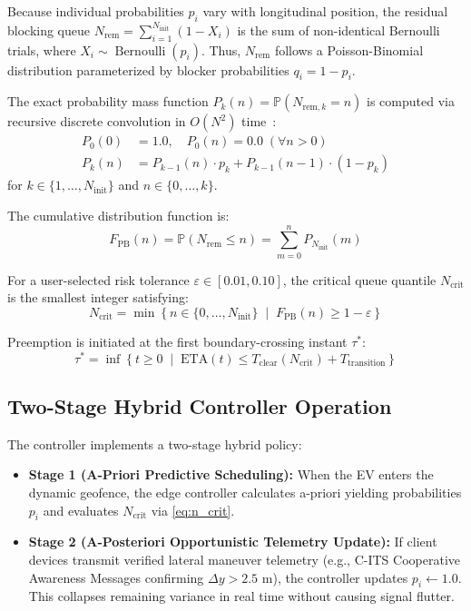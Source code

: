 \documentclass[journal,10pt,twocolumn]{IEEEtran}
\begin{document}
Because individual probabilities $p_i$ vary with longitudinal position, the residual blocking queue $N_{\text{rem}} = \sum_{i=1}^{N_{\text{init}}} (1 - X_i)$ is the sum of non-identical Bernoulli trials, where $X_i \sim \operatorname{Bernoulli}(p_i)$. Thus, $N_{\text{rem}}$ follows a Poisson-Binomial distribution parameterized by blocker probabilities $q_i = 1 - p_i$.

The exact probability mass function $P_k(n) = \mathbb{P}(N_{\text{rem}, k} = n)$ is computed via recursive discrete convolution in $O(N^2)$ time~\cite{hong2013}:
\begin{align}
P_0(0) &= 1.0, \quad P_0(n) = 0.0 \; (\forall n > 0) \\
P_k(n) &= P_{k-1}(n) \cdot p_k + P_{k-1}(n-1) \cdot (1 - p_k)
\end{align}
for $k \in \{1, \dots, N_{\text{init}}\}$ and $n \in \{0, \dots, k\}$.

The cumulative distribution function is:
\begin{equation}
F_{\text{PB}}(n) = \mathbb{P}(N_{\text{rem}} \le n) = \sum_{m=0}^n P_{N_{\text{init}}}(m)
\end{equation}

For a user-selected risk tolerance $\varepsilon \in [0.01, 0.10]$, the critical queue quantile $N_{\text{crit}}$ is the smallest integer satisfying:
\begin{equation}
\label{eq:n_crit}
N_{\text{crit}} = \min \left\{ n \in \{0, \dots, N_{\text{init}}\} \;\middle|\; F_{\text{PB}}(n) \ge 1 - \varepsilon \right\}
\end{equation}

Preemption is initiated at the first boundary-crossing instant $\tau^*$:
\begin{equation}
\tau^* = \inf \left\{ t \ge 0 \;\middle|\; \text{ETA}(t) \le T_{\text{clear}}(N_{\text{crit}}) + T_{\text{transition}} \right\}
\end{equation}

\subsection{Two-Stage Hybrid Controller Operation}
The controller implements a two-stage hybrid policy:
\begin{itemize}
    \item \textbf{Stage 1 (A-Priori Predictive Scheduling):} When the EV enters the dynamic geofence, the edge controller calculates a-priori yielding probabilities $p_i$ and evaluates $N_{\text{crit}}$ via \eqref{eq:n_crit}.
    \item \textbf{Stage 2 (A-Posteriori Opportunistic Telemetry Update):} If client devices transmit verified lateral maneuver telemetry (e.g., C-ITS Cooperative Awareness Messages confirming $\Delta y > 2.5\text{ m}$), the controller updates $p_i \leftarrow 1.0$. This collapses remaining variance in real time without causing signal flutter.
\end{itemize}
\end{document}
